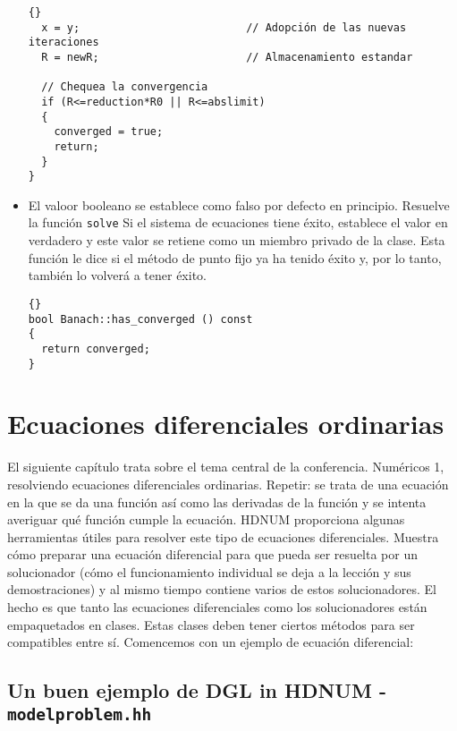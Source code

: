 \begin{itemize}
{{\begin{lstlisting}{}
  x = y;                          // Adopción de las nuevas iteraciones 
  R = newR;                       // Almacenamiento estandar

  // Chequea la convergencia
  if (R<=reduction*R0 || R<=abslimit)
  {
    converged = true;
    return;
  }
}
\end{lstlisting}}}

\item El valoor booleano se establece como falso por defecto en principio.  Resuelve la función 
 \lstinline{solve} Si el sistema de ecuaciones tiene éxito, establece el valor en verdadero y este valor se retiene como un miembro privado de la clase. Esta función le dice si el método de punto fijo ya ha tenido éxito y, por lo tanto, también lo volverá a tener éxito.

{\footnotesize{\begin{lstlisting}{}
bool Banach::has_converged () const
{
  return converged;
}
\end{lstlisting}}}
\end{itemize}



\section{Ecuaciones diferenciales ordinarias}

El siguiente capítulo trata sobre el tema central de la conferencia.
Numéricos 1, resolviendo ecuaciones diferenciales ordinarias. Repetir: se trata de una ecuación en la que se da una función así como las derivadas de la función y se intenta averiguar qué función cumple la ecuación. HDNUM proporciona algunas herramientas útiles para resolver este tipo de ecuaciones diferenciales. Muestra cómo preparar una ecuación diferencial para que pueda ser resuelta por un solucionador (cómo el funcionamiento individual se deja a la lección y sus demostraciones) y al mismo tiempo contiene varios de estos solucionadores. El hecho es que tanto las ecuaciones diferenciales como los solucionadores están empaquetados en clases. Estas clases deben tener ciertos métodos para ser compatibles entre sí. Comencemos con un ejemplo de ecuación diferencial:

\subsection{Un buen ejemplo de DGL in HDNUM - \lstinline{modelproblem.hh}}


